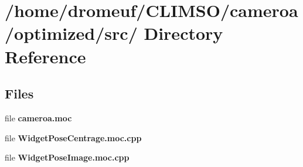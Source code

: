 \section{/home/dromeuf/CLIMSO/cameroa/optimized/src/ Directory Reference}
\label{dir_4ea06c2cfab4da2c4e9d75dd129d64cd}
\subsection*{Files}
\begin{CompactItemize}
\item 
file {\bf cameroa.moc}
\item 
file {\bf Widget\-Pose\-Centrage.moc.cpp}
\item 
file {\bf Widget\-Pose\-Image.moc.cpp}
\end{CompactItemize}
